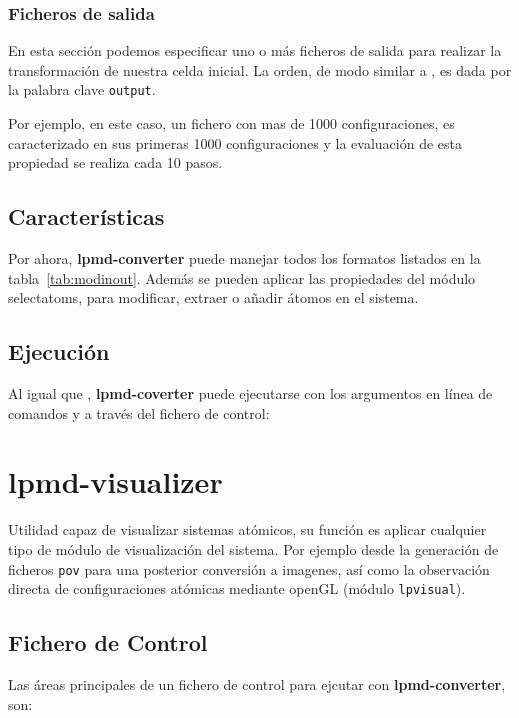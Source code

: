 \subsubsection{Ficheros de salida}
En esta secci\'on podemos especificar uno o m\'as ficheros de salida para realizar la transformaci\'on de nuestra celda inicial. La orden, de modo similar a \lpmd, es dada por la palabra clave \verb|output|.


Por ejemplo, en este caso, un fichero con mas de 1000 configuraciones, es caracterizado en sus primeras 1000 configuraciones y la evaluaci\'on de esta propiedad se realiza cada 10 pasos.


\subsection{Caracter\'isticas}
Por ahora, \textbf{lpmd-converter} puede manejar todos los formatos listados en la tabla~\ref{tab:modinout}. Adem\'as se pueden aplicar las propiedades del m\'odulo selectatoms, para modificar, extraer o a\~nadir \'atomos en el sistema.

\subsection{Ejecuci\'on}
Al igual que \lpmd, \textbf{lpmd-coverter} puede ejecutarse con los argumentos en l\'inea de comandos y a trav\'es del fichero de control:


\section{lpmd-visualizer}
Utilidad capaz de visualizar sistemas at\'omicos, su funci\'on es aplicar cualquier tipo de m\'odulo de visualizaci\'on del sistema. Por ejemplo desde la generaci\'on de ficheros \verb|pov| para una posterior conversi\'on a imagenes, as\'i como la observaci\'on directa de configuraciones at\'omicas mediante openGL (m\'odulo \verb|lpvisual|).

\subsection{Fichero de Control}

Las \'areas principales de un fichero de control para ejcutar con \textbf{lpmd-converter}, son:

